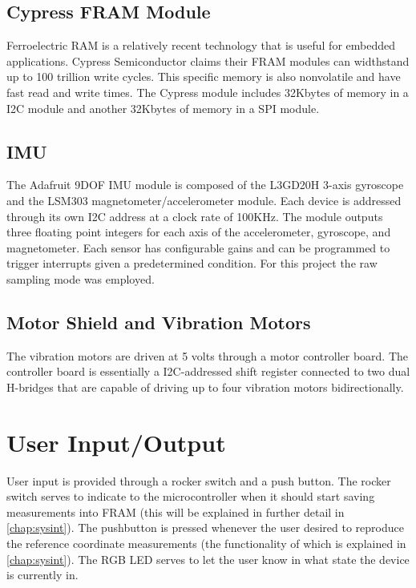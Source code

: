 \subsection{Cypress FRAM Module}

Ferroelectric RAM is a relatively recent technology that is useful for embedded applications.  Cypress Semiconductor claims their FRAM modules can widthstand up to 100 trillion write cycles.  This specific memory is also nonvolatile and have fast read and write times.  The Cypress module includes 32Kbytes of memory in a I2C module and another 32Kbytes of memory in a SPI module.  

\subsection{IMU}
\label{chap:hardware:ssec:imu}

The Adafruit 9DOF IMU module is composed of the L3GD20H 3-axis gyroscope and the LSM303 magnetometer/accelerometer module.  Each device is addressed through its own I2C address at a clock rate of 100KHz.  The module outputs three floating point integers for each axis of the accelerometer, gyroscope, and magnetometer.  Each sensor has configurable gains and can be programmed to trigger interrupts given a predetermined condition.  For this project the raw sampling mode was employed.

\subsection{Motor Shield and Vibration Motors}

The vibration motors are driven at 5 volts through a motor controller board.  The controller board is essentially a I2C-addressed shift register connected to two dual H-bridges that are capable of driving up to four vibration motors bidirectionally.

\section{User Input/Output}

User input is provided through a rocker switch and a push button.  The rocker switch serves to indicate to the microcontroller when it should start saving measurements into FRAM (this will be explained in further detail in \autoref{chap:sysint}).  The pushbutton is pressed whenever the user desired to reproduce the reference coordinate measurements (the functionality of which is explained in \autoref{chap:sysint}).  The RGB LED serves to let the user know in what state the device is currently in.


